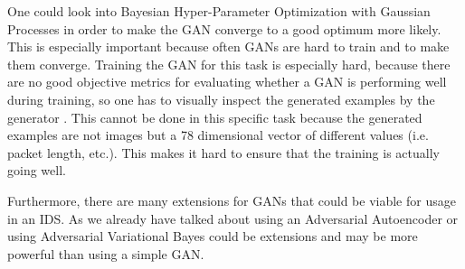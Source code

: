 \documentclass[]{article}
\begin{document}
	One could look into Bayesian Hyper-Parameter Optimization with Gaussian Processes in order to make the GAN converge to a good optimum more likely. This is especially important because often GANs are hard to train and to make them converge. Training the GAN for this task is especially hard, because there are no good objective metrics for evaluating whether a GAN is performing well during training, so one has to visually inspect the generated examples by the generator \cite{https://doi.org/10.48550/arxiv.1606.03498}. This cannot be done in this specific task because the generated examples are not images but a 78 dimensional vector of different values (i.e. packet length, etc.). This makes it hard to ensure that the training is actually going well. 
	
	Furthermore, there are many extensions for GANs that could be viable for usage in an IDS. As we already have talked about using an Adversarial Autoencoder or using Adversarial Variational Bayes could be extensions and may be more powerful than using a simple GAN. 
	\newpage
	
	
\end{document}
